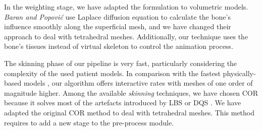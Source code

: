 
In the weighting stage, we have adapted the formulation \cite{Baran:2007}  to volumetric models. \emph{Baran and Popovi\'{c}} use Laplace diffusion equation to calculate the bone's influence smoothly along the superficial mesh, and we have changed their approach to deal with tetrahedral meshes. Additionally, our technique uses the bone's tissues instead of virtual skeleton  to control the animation process.



The skinning phase of our pipeline is very fast, particularly considering the complexity of the used patient models. In comparison with the fastest physically-based models \cite{Bender:2014}, our algorithm offers interactive rates with meshes of one order of magnitude higher. Among the available \emph{skinning} techniques, we have chosen \acs{COR} \cite{le2016real} because it solves most of the artefacts introduced by \acs{LBS} \cite{thalmann88} or \acs{DQS} \cite{Kavan2008}. We have adapted the original \acs{COR} method to deal with tetrahedral meshes. This method requires to add a new stage to the pre-process module.%


